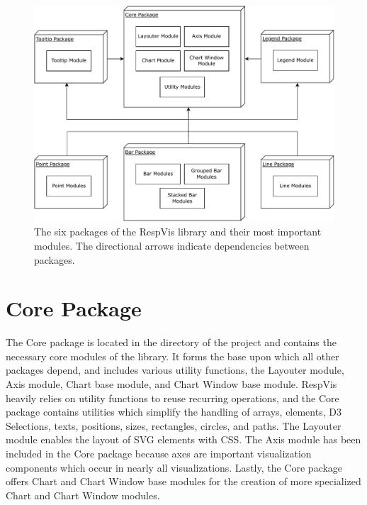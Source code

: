\begin{figure}[tp]
\centering
\includegraphics[keepaspectratio,width=\linewidth,height=\fullh]
{diagrams/respvis-packages.pdf}
\caption[Packages of RespVis]{
The six packages of the RespVis library and their most important modules. The
directional arrows indicate dependencies between packages.
}
\label{fig:Packages}
\end{figure}







\section{Core Package}

The Core package is located in the  directory of
the project and contains the necessary core modules of the library. It
forms the base upon which all other packages depend, and includes
various utility functions, the Layouter module, Axis module, Chart
base module, and Chart Window base module. RespVis heavily relies on
utility functions to reuse recurring operations, and the Core package
contains utilities which simplify the handling of arrays, elements, D3
Selections, texts, positions, sizes, rectangles, circles, and paths.
The Layouter module enables the layout of SVG elements with CSS. The
Axis module has been included in the Core package because axes are
important visualization components which occur in nearly all
visualizations. Lastly, the Core package offers Chart and Chart Window
base modules for the creation of more specialized Chart and Chart
Window modules.




